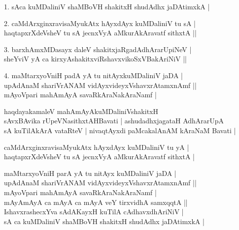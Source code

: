 \begin{entry}
\begin{shl}
1. sAca kuMDaliniV shaMBoVH shakitxH shudAdhx jaDAtimxkA |
\end{shl}
\smallskip
{}
\smallskip
\begin{shl}
2. caMdArxginxravisaMyukAtx hAyxdAyx kuMDaliniV tu sA |\\[1pt]
haqtapxrXdeVsheV tu sA jecnxVyA aMkurAkAravatf sithxtA ||
\end{shl}
\medskip
{}
\smallskip
\begin{shl}
3. barxhAmxMDasayx daleV shakitxjaRgadAdhArarUpiNeV |\\[1pt]
sheYviV yA ca kirxyAshakitxviRshavxvikoSxVBakAriNiV ||
\end{shl}
\smallskip
{}
\smallskip
\begin{shl}
4. maMtarxyoVniH padA yA tu nitAyxkuMDaliniV jaDA |\\[1pt]
upAdAnaM shariVrANAM vidAyxvideyxVshavxrAtamxnAmf ||\\[1pt]
mAyoVpari mahAmAyA savaRkAraNakAraNamf |
\end{shl}
\smallskip
{}
\smallskip
\begin{shl}
haqdayakamaleV mahAmAyAkuMDaliniVshakitxH\\[1pt]
sAvxBAvika rUpeVNasithxtAHBavati | ashudadhxjagataH AdhArarUpA\\[1pt]
sA kuTilAkArA vataRteV | nivaqtAyxdi paMcakalAnAM kAraNaM Bavati |
\end{shl}
\smallskip
\begin{shl}
caMdArxginxravisaMyukAtx hAyxdAyx kuMDaliniV tu yA |\\[1pt]
haqtapxrXdeVsheV tu sA jecnxVyA aMkurAkAravatf sithxtA |\\[1pt]
\end{shl}
\smallskip
{}
\smallskip
\begin{shl}
maMtarxyoVniH parA yA tu nitAyx kuMDaliniV jaDA |\\[1pt]
upAdAnaM shariVrANAM vidAyxvideyxVshavxrAtamxnAmf ||\\[1pt]
mAyoVpari mahAmAyA savaRkAraNakAraNamf |\\[1pt]
mAyAmAyA ca mAyA ca mAyA veY tirxvidhA samxqqtA ||\\[1pt]
IshavxrashecxYva sAdAKayxH kuTilA cAdhavxdhAriNiV |\\[1pt]
sA ca kuMDaliniV shaMBoVH shakitxH shudAdhx jaDAtimxkA |
\end{shl}
\smallskip
{}

\end{entry}
